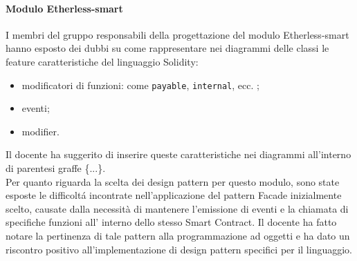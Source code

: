 	\paragraph{Modulo Etherless-smart}
		I membri del gruppo responsabili della progettazione del modulo Etherless-smart hanno esposto dei dubbi su come rappresentare nei diagrammi delle classi le feature caratteristiche del linguaggio Solidity:
		\begin{itemize}
			\item modificatori di funzioni: come \texttt{payable}, \texttt{internal}, ecc. ;
			\item eventi;
			\item modifier.
		\end{itemize}
		Il docente ha suggerito di inserire queste caratteristiche nei diagrammi all'interno di parentesi graffe \{...\}.\\
		\newline
		Per quanto riguarda la scelta dei design pattern per questo modulo, sono state esposte le difficoltá incontrate nell'applicazione del pattern Facade inizialmente scelto, causate dalla necessità di mantenere l'emissione di eventi e la chiamata di specifiche funzioni all' interno dello stesso Smart Contract. Il docente ha fatto notare la pertinenza di tale pattern alla programmazione ad oggetti e ha dato un riscontro positivo all'implementazione di design pattern specifici per il linguaggio.
